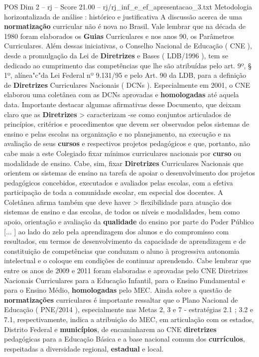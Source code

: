 \begin{textsample}{POS Dim 2 – rj – Score 21.00 – rj/rj\_inf\_e\_ef\_apresentacao\_3.txt}  \label{ex:f2_pos_232}
Metodologia horizontalizada de análise : histórico e justificativa A discussão acerca de uma \textbf{normatização} curricular não é nova no Brasil.
Vale lembrar que na década de 1980 foram elaborados os \textbf{Guias} Curriculares e nos anos 90, os Parâmetros Curriculares.
Além dessas iniciativas, o Conselho Nacional de Educação ( CNE ), desde a promulgação da Lei de \textbf{Diretrizes} e Bases ( LDB/1996 ), tem se dedicado ao cumprimento das competências que lhe são atribuídas pelo art. 9º, § 1º, alínea"c"da Lei Federal nº 9.131/95 e pelo Art. 90 da LDB, para a definição de \textbf{Diretrizes} Curriculares Nacionais ( DCNs ).
Especialmente em 2001, o CNE elaborou uma coletânea com as DCNs aprovadas e \textbf{homologadas} até aquela data.
Importante destacar algumas afirmativas desse Documento, que deixam claro que as \textbf{Diretrizes} > caracterizam -se como conjuntos articulados de princípios, critérios e procedimentos que devem ser observados pelos sistemas de ensino e pelas escolas na organização e no planejamento, na execução e na avaliação de seus \textbf{cursos} e respectivos projetos pedagógicos e que, portanto, não cabe mais a este Colegiado fixar mínimos curriculares nacionais por \textbf{curso} ou modalidade de ensino.
Cabe, sim, fixar \textbf{Diretrizes} Curriculares Nacionais que orientem os sistemas de ensino na tarefa de apoiar o desenvolvimento dos projetos pedagógicos concebidos, executados e avaliados pelas escolas, com a efetiva participação de toda a comunidade escolar, em especial dos docentes.
A Coletânea afirma também que deve haver > flexibilidade para atuação dos sistemas de ensino e das escolas, de todos os níveis e modalidades, bem como apoio, orientação e avaliação da \textbf{qualidade} do ensino por parte do Poder Público [... ] ao lado do zelo pela aprendizagem dos alunos e do compromisso com resultados, em termos de desenvolvimento da capacidade de aprendizagem e de constituição de competências que conduzam o aluno à progressiva autonomia intelectual e o coloque em condições de continuar aprendendo.
Cabe lembrar que entre os anos de 2009 e 2011 foram elaboradas e aprovadas pelo CNE Diretrizes Nacionais Curriculares para a Educação Infantil, para o Ensino Fundamental e para o Ensino Médio, \textbf{homologadas} pelo MEC.
Ainda sobre a questão de \textbf{normatizações} curriculares é importante ressaltar que o Plano Nacional de Educação ( PNE/2014 ), especialmente nas Metas 2, 3 e 7 - estratégias 2.1 ; 3.2 e 7.1, respectivamente, indica a atribuição do MEC, em articulação com os estados, Distrito Federal e \textbf{municípios}, de encaminharem ao CNE \textbf{diretrizes} pedagógicas para a Educação Básica e a base nacional comum dos \textbf{currículos}, respeitadas a diversidade regional, \textbf{estadual} e local.

\end{textsample}
